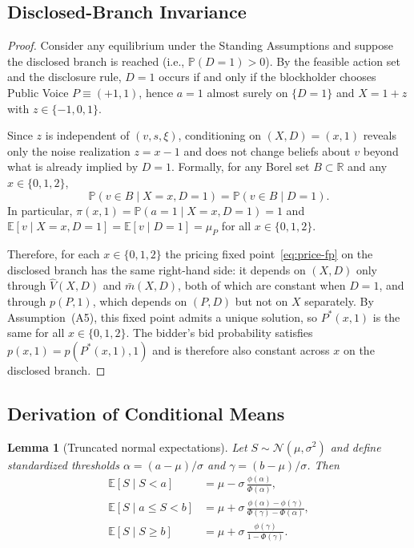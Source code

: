 \documentclass[11pt]{article}
\newtheorem{lemma}{Lemma}
\newcommand{\E}{\mathbb{E}}
\newcommand{\PP}{\mathbb{P}}
\newcommand{\1}{\mathbf{1}}
\newcommand{\R}{\mathbb{R}}
\begin{document}
\subsection{Disclosed-Branch Invariance}
\label{app:proof-disclosed-invariance}

\begin{proof}
Consider any equilibrium under the Standing Assumptions and suppose the disclosed branch is reached (i.e., $\PP(D=1)>0$). By the feasible action set and the disclosure rule, $D=1$ occurs if and only if the blockholder chooses Public Voice $P\equiv(+1,1)$, hence $a=1$ almost surely on $\{D=1\}$ and $X=1+z$ with $z\in\{-1,0,1\}$.

Since $z$ is independent of $(v,s,\xi)$, conditioning on $(X,D)=(x,1)$ reveals only the noise realization $z=x-1$ and does not change beliefs about $v$ beyond what is already implied by $D=1$. Formally, for any Borel set $B\subset\R$ and any $x\in\{0,1,2\}$,
\[
\PP(v\in B \mid X=x,D=1)=\PP(v\in B \mid D=1).
\]
In particular, $\pi(x,1)=\PP(a=1 \mid X=x,D=1)=1$ and $\E[v \mid X=x,D=1]=\E[v \mid D=1]=\mu_P$ for all $x\in\{0,1,2\}$.

Therefore, for each $x\in\{0,1,2\}$ the pricing fixed point~\eqref{eq:price-fp} on the disclosed branch has the same right-hand side: it depends on $(X,D)$ only through $\hat V(X,D)$ and $\bar{m}(X,D)$, both of which are constant when $D=1$, and through $p(P,1)$, which depends on $(P,D)$ but not on $X$ separately. By Assumption~\textup{(A5)}, this fixed point admits a unique solution, so $P^*(x,1)$ is the same for all $x\in\{0,1,2\}$. The bidder's bid probability satisfies $p(x,1)=p(P^*(x,1),1)$ and is therefore also constant across $x$ on the disclosed branch.
\end{proof}

\subsection{Derivation of Conditional Means}
\label{app:deriv-conditional-means}

\begin{lemma}[Truncated normal expectations]
\label{lem:truncnorm}
Let $S\sim\mathcal{N}(\mu,\sigma^2)$ and define standardized thresholds $\alpha=(a-\mu)/\sigma$ and $\gamma=(b-\mu)/\sigma$. Then
\begin{align*}
\E[S \mid S<a] &= \mu - \sigma\,\frac{\phi(\alpha)}{\Phi(\alpha)}, \\
\E[S \mid a\le S<b] &= \mu + \sigma\,\frac{\phi(\alpha)-\phi(\gamma)}{\Phi(\gamma)-\Phi(\alpha)}, \\
\E[S \mid S\ge b] &= \mu + \sigma\,\frac{\phi(\gamma)}{1-\Phi(\gamma)}.
\end{align*}
\end{lemma}
\end{document}
